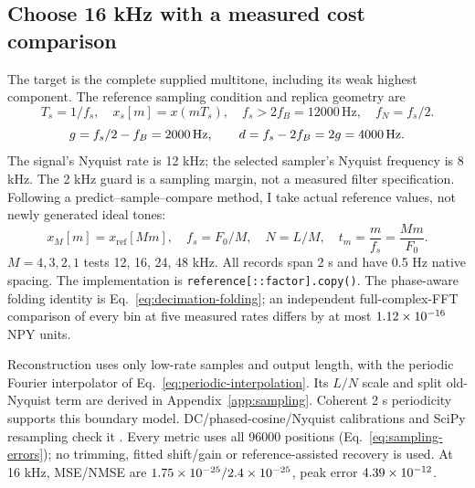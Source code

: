 \subsection{Choose 16 kHz with a measured cost comparison}
The target is the complete supplied multitone, including its weak highest
component. The reference sampling condition and replica geometry are
 \citep{shannon1949noise}
\begin{equation}
 T_s=1/f_s,\quad x_s[m]=x(mT_s),\quad
 f_s>2f_B=12000\,\mathrm{Hz},\quad f_N=f_s/2.
 \label{eq:rate-condition}
\end{equation}
\begin{equation}
 g=f_s/2-f_B=2000\,\mathrm{Hz},\qquad
 d=f_s-2f_B=2g=4000\,\mathrm{Hz}.
 \label{eq:rate-guard}
\end{equation}
The signal's Nyquist rate is 12 kHz; the selected sampler's Nyquist
frequency is 8 kHz. The 2 kHz guard is a sampling margin, not a measured
filter specification. Following a predict--sample--compare method,
I take actual reference values, not newly generated ideal tones:
\begin{equation}
 x_M[m]=x_{\mathrm{ref}}[Mm],\quad
 f_s=F_0/M,\quad N=L/M,\quad
 t_m=\frac m{f_s}=\frac{Mm}{F_0}.
 \label{eq:integer-sampling}
\end{equation}
$ M=4,3,2,1 $ tests 12, 16, 24, 48 kHz. All records span 2 s and have 0.5 Hz native
spacing. The implementation is \texttt{reference[::factor].copy()}.
The phase-aware folding identity is Eq.~\eqref{eq:decimation-folding};
an independent full-complex-FFT comparison of every bin at five measured
rates differs by at most $1.12\times10^{-16} $ NPY units.

\begin{table}[H]
 \centering
 \caption{Same 2 s record, common periodic recovery and all 96000 evaluation positions. Raw payload compares equal bits/sample against 16 kHz; 12 kHz is phase-sensitive critical sampling.}
 \label{tab:rates}
 
\end{table}

Reconstruction uses only low-rate samples and output length, with the
periodic Fourier interpolator of Eq.~\eqref{eq:periodic-interpolation}.
Its $ L/N $ scale and split old-Nyquist term are derived in
Appendix~\ref{app:sampling}. Coherent 2 s periodicity supports this boundary
model. DC/phased-cosine/Nyquist calibrations and SciPy resampling check it
 \citep{scipy1153resample}. Every metric uses all 96000 positions
(Eq.~\eqref{eq:sampling-errors}); no trimming, fitted shift/gain or
reference-assisted recovery is used. At 16 kHz, MSE/NMSE are
$1.75\times10^{-25}/2.4\times10^{-25} $, peak error $4.39\times10^{-12} $.

